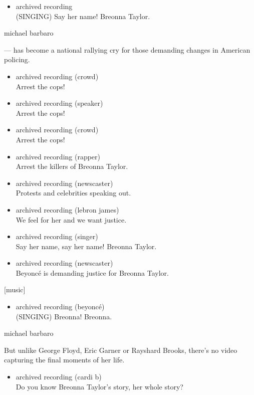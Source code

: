 \begin{itemize}
\tightlist
\item
  archived recording\\
  (SINGING) Say her name! Breonna Taylor.
\end{itemize}

michael barbaro

--- has become a national rallying cry for those demanding changes in
American policing.

\begin{itemize}
\item
  archived recording (crowd)\\
  Arrest the cops!
\item
  archived recording (speaker)\\
  Arrest the cops!
\item
  archived recording (crowd)\\
  Arrest the cops!
\item
  archived recording (rapper)\\
  Arrest the killers of Breonna Taylor.
\item
  archived recording (newscaster)\\
  Protests and celebrities speaking out.
\item
  archived recording (lebron james)\\
  We feel for her and we want justice.
\item
  archived recording (singer)\\
  Say her name, say her name! Breonna Taylor.
\item
  archived recording (newscaster)\\
  Beyoncé is demanding justice for Breonna Taylor.
\end{itemize}

{[}music{]}

\begin{itemize}
\tightlist
\item
  archived recording (beyoncé)\\
  (SINGING) Breonna! Breonna.
\end{itemize}

michael barbaro

But unlike George Floyd, Eric Garner or Rayshard Brooks, there's no
video capturing the final moments of her life.

\begin{itemize}
\tightlist
\item
  archived recording (cardi b)\\
  Do you know Breonna Taylor's story, her whole story?
\end{itemize}

